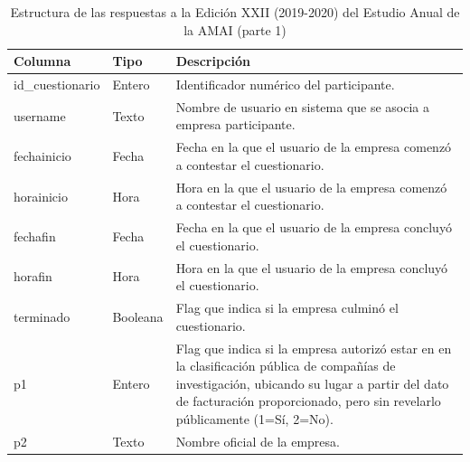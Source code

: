 \begin{table}[]
\caption{Estructura de las respuestas a la Edición XXII (2019-2020) del Estudio Anual de la AMAI (parte 1)}
\label{tab:raw2019_1}
\begin{tabular}{|l|l|l|}
\hline
Columna          & Tipo  & Descripción                                                                                    \\ \hline
id\_cuestionario & Entero   & Identificador numérico del participante.                                                        \\ \hline
username         & Texto & \parbox[t]{8cm}{Nombre de usuario en sistema que se asocia a empresa participante. \vspace{0.1cm}}                              \\ \hline
fechainicio      & Fecha & \parbox[t]{8cm}{Fecha en la que el usuario de la empresa comenzó a contestar el cuestionario. \vspace{0.1cm}}                   \\ \hline
horainicio       & Hora  & \parbox[t]{8cm}{Hora en la que el usuario de la empresa comenzó a contestar el cuestionario. \vspace{0.1cm}}                    \\ \hline
fechafin         & Fecha & \parbox[t]{8cm}{Fecha en la que el usuario de la empresa concluyó el cuestionario. \vspace{0.1cm}}                              \\ \hline
horafin          & Hora  & \parbox[t]{8cm}{Hora en la que el usuario de la empresa concluyó el cuestionario. \vspace{0.1cm}}                               \\ \hline
terminado        & Booleana  & \parbox[t]{8cm}{Flag que indica si la empresa culminó el cuestionario. \vspace{0.1cm}}                                          \\ \hline
p1 &
  Entero &
  \parbox[t]{8cm}{Flag que indica si la empresa autorizó estar en en la clasificación pública de compañías de investigación, ubicando su lugar a partir del dato de facturación proporcionado, pero sin revelarlo públicamente (1=Sí, 2=No). \vspace{0.1cm}} \\ \hline
p2               & Texto & Nombre oficial de la empresa.                                                                  \\ \hline

\end{tabular}
\end{table}
